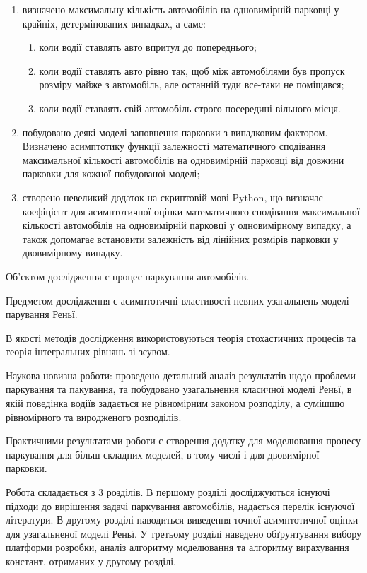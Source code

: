 \begin{enumerate}
	\item визначено максимальну кількість автомобілів на одновимірній парковці у крайніх, 			детермінованих випадках, а саме:
	\begin{enumerate}
		\item коли водії ставлять авто впритул до попереднього;
		\item коли водії ставлять авто рівно так, щоб між автомобілями був пропуск розміру 			майже з автомобіль, але останній туди все-таки не поміщався;
		\item коли водії ставлять свій автомобіль строго посередині вільного місця.
	\end{enumerate}
        	\item побудовано деякі моделі заповнення парковки з випадковим фактором. Визначено 		асимптотику функції залежності математичного сподівання максимальної кількості 		автомобілів на одновимірній парковці від довжини парковки для кожної побудованої моделі;
	\item створено невеликий додаток на скриптовій мові Python, що визначає коефіцієнт для 		асимптотичної оцінки математичного сподівання максимальної кількості автомобілів на 		одновимірній парковці у одновимірному випадку, а також допомагає встановити 			залежність від лінійних розмірів парковки у двовимірному випадку.
\end{enumerate}

Об'єктом дослідження є процес паркування автомобілів.

Предметом дослідження є асимптотичні властивості певних узагальнень моделі парування Реньї.

В якості методів дослідження використовуються теорія стохастичних процесів та теорія інтегральних рівнянь зі зсувом.

Наукова новизна роботи: проведено детальний аналіз результатів щодо проблеми паркування та пакування, та побудовано узагальнення класичної моделі Реньї, в якій поведінка водіїв задається не рівномірним законом розподілу, а сумішшю рівномірного та виродженого розподілів.

Практичними результатами роботи є створення додатку для моделювання процесу паркування для більш складних моделей, в тому числі і для двовимірної парковки.

Робота складається з 3 розділів. В першому розділі досліджуються існуючі підходи до вирішення задачі паркування автомобілів, надається перелік існуючої літератури. В другому розділі наводиться виведення точної асимптотичної оцінки для узагальненої моделі Реньї. У третьому розділі наведено обґрунтування вибору платформи розробки, аналіз алгоритму моделювання та алгоритму вирахування констант, отриманих у другому розділі.